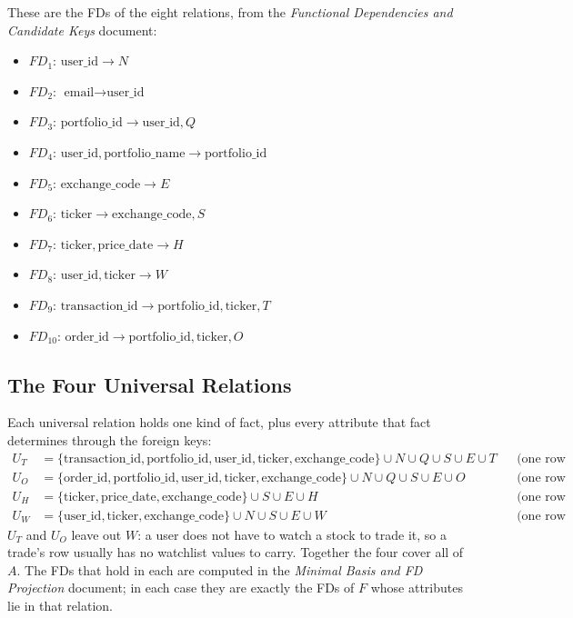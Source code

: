 \documentclass{article}
\newcommand{\at}[1]{\text{#1}}
\begin{document}
These are the FDs of the eight relations, from the \emph{Functional Dependencies and Candidate Keys} document:
\begin{itemize}[leftmargin=*, nosep]
  \item $FD_1$: $\at{user\_id} \rightarrow N$
  \item $FD_2$: $\at{email} \rightarrow \at{user\_id}$
  \item $FD_3$: $\at{portfolio\_id} \rightarrow \at{user\_id}, Q$
  \item $FD_4$: $\at{user\_id}, \at{portfolio\_name} \rightarrow \at{portfolio\_id}$
  \item $FD_5$: $\at{exchange\_code} \rightarrow E$
  \item $FD_6$: $\at{ticker} \rightarrow \at{exchange\_code}, S$
  \item $FD_7$: $\at{ticker}, \at{price\_date} \rightarrow H$
  \item $FD_8$: $\at{user\_id}, \at{ticker} \rightarrow W$
  \item $FD_9$: $\at{transaction\_id} \rightarrow \at{portfolio\_id}, \at{ticker}, T$
  \item $FD_{10}$: $\at{order\_id} \rightarrow \at{portfolio\_id}, \at{ticker}, O$
\end{itemize}

\subsection*{The Four Universal Relations}

Each universal relation holds one kind of fact, plus every attribute that fact determines through the foreign keys:
\begin{align*}
  U_T &= \{\at{transaction\_id}, \at{portfolio\_id}, \at{user\_id}, \at{ticker}, \at{exchange\_code}\} \cup N \cup Q \cup S \cup E \cup T && \text{(one row per trade)} \\
  U_O &= \{\at{order\_id}, \at{portfolio\_id}, \at{user\_id}, \at{ticker}, \at{exchange\_code}\} \cup N \cup Q \cup S \cup E \cup O && \text{(one row per limit order)} \\
  U_H &= \{\at{ticker}, \at{price\_date}, \at{exchange\_code}\} \cup S \cup E \cup H && \text{(one row per daily price)} \\
  U_W &= \{\at{user\_id}, \at{ticker}, \at{exchange\_code}\} \cup N \cup S \cup E \cup W && \text{(one row per watchlist entry)}
\end{align*}
$U_T$ and $U_O$ leave out $W$: a user does not have to watch a stock to trade it, so a trade's row usually has no watchlist values to carry. Together the four cover all of $A$. The FDs that hold in each are computed in the \emph{Minimal Basis and FD Projection} document; in each case they are exactly the FDs of $F$ whose attributes lie in that relation.
\end{document}
